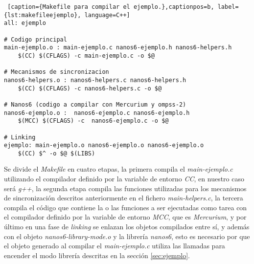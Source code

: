 \begin{minipage}{\linewidth}
\begin{lstlisting} [caption={Makefile para compilar el ejemplo.},captionpos=b, label={lst:makefileejemplo}, language=C++]                                                                                                                                               
all: ejemplo

# Codigo principal
main-ejemplo.o : main-ejemplo.c nanos6-ejemplo.h nanos6-helpers.h                                                                                                                                       
    $(CC) $(CFLAGS) -c main-ejemplo.c -o $@                                                                                                                                                                 

# Mecanismos de sincronizacion
nanos6-helpers.o : nanos6-helpers.c nanos6-helpers.h
    $(CC) $(CFLAGS) -c nanos6-helpers.c -o $@                                                                                                                                                                 

# Nanos6 (codigo a compilar con Mercurium y ompss-2)
nanos6-ejemplo.o :  nanos6-ejemplo.c nanos6-ejemplo.h
    $(MCC) $(CFLAGS) -c  nanos6-ejemplo.c -o $@                                                                                                                                                             

# Linking
ejemplo: main-ejemplo.o nanos6-ejemplo.o nanos6-ejemplo.o                                                                                                                                      
    $(CC) $^ -o $@ $(LIBS)                                                                                                                                                                                    
\end{lstlisting}
\end{minipage}

Se divide el \textit{Makefile} en cuatro etapas, la primera compila el \textit{main-ejemplo.c} utilizando el compilador definido por la variable de entorno \textit{CC}, en nuestro caso será \textit{g++}, la segunda etapa compila las funciones utilizadas para los mecanismos de sincronización descritos anteriormente en el fichero \textit{main-helpers.c}, la tercera compila el código que contiene la o las funciones a ser ejecutadas como tarea con el compilador definido por la variable de entorno \textit{MCC}, que es \textit{Mercurium}, y por último en una fase de \textit{linking} se enlazan los objetos compilados entre sí, y además con el objeto \textit{nanos6-library-mode.o} y la librería \textit{nanos6}, esto es necesario por que el objeto generado al compilar el \textit{main-ejemplo.c} utiliza las llamadas para encender el modo librería descritas en la sección \ref{sec:ejemplo}.

